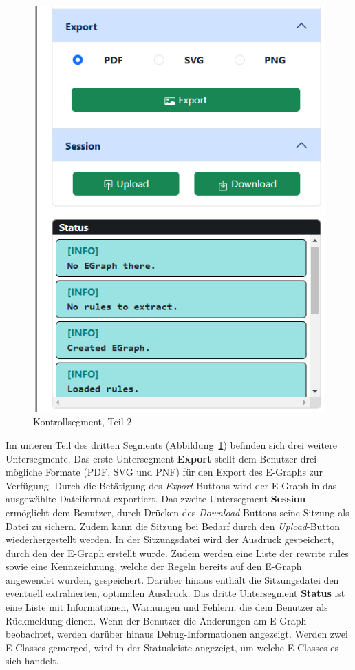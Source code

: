 \begin{figure}
    \vspace{-5mm}
    \begin{center}
      \includegraphics[scale=0.6]{../fig/control2.png}
    \end{center}
    \caption{Kontrollsegment, Teil 2}
    \label{fig:segment32}
\end{figure}

Im unteren Teil des dritten Segments (Abbildung~\ref{fig:segment32}) befinden sich drei weitere Untersegmente.  
Das erste Untersegment \textbf{Export} stellt dem Benutzer drei mögliche Formate (PDF, SVG und PNF) für den Export des E-Graphs zur Verfügung. Durch die Betätigung des \textit{Export}-Buttons
wird der E-Graph in das ausgewählte Dateiformat exportiert.
Das zweite Untersegment \textbf{Session} ermöglicht dem Benutzer, durch Drücken des \textit{Download}-Buttons seine Sitzung als Datei zu sichern. Zudem kann die Sitzung bei Bedarf
durch den \textit{Upload}-Button wiederhergestellt werden. 
In der Sitzungsdatei wird der Ausdruck gespeichert, durch den der E-Graph erstellt wurde. 
Zudem werden eine Liste der rewrite rules sowie eine Kennzeichnung, welche der Regeln bereits auf den E-Graph angewendet wurden, gespeichert.
Darüber hinaus enthält die Sitzungsdatei den eventuell extrahierten, optimalen Ausdruck.
Das dritte Untersegment \textbf{Status} ist eine Liste mit Informationen, Warnungen und Fehlern, die dem Benutzer als Rückmeldung dienen. Wenn der Benutzer die Änderungen am E-Graph beobachtet, werden
darüber hinaus Debug-Informationen angezeigt. Werden zwei E-Classes gemerged, wird in der Statusleiste angezeigt, um welche E-Classes es sich handelt.  

